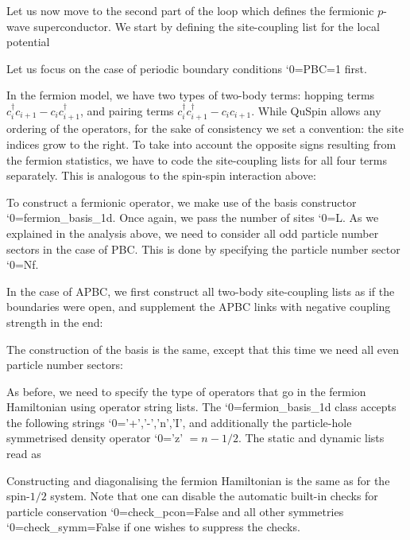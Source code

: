 \documentclass{SciPost}
\newcommand\0{\scalebox{-1}[1]{0}}
\let\svttfamily\ttfamily
\renewcommand\ttfamily{\svttfamily\catcode`0=\active }
\renewcommand\texttt{\bgroup\ttfamily\texttthelp}
\def\texttthelp#1{#1\egroup}
\newcommand{\JWcode}{example6.py}
\begin{document}
Let us now move to the second part of the loop which defines the fermionic $p$-wave superconductor. We start by defining the site-coupling list for the local potential

Let us focus on the case of periodic boundary conditions \texttt{PBC=1} first. 

In the fermion model, we have two types of two-body terms: hopping terms $c^\dagger_{i}c_{i+1} - c_{i}c^\dagger_{i+1}$, and pairing terms $c^\dagger_{i}c^\dagger_{i+1} - c_{i}c_{i+1}$. While QuSpin allows any ordering of the operators, for the sake of consistency we set a convention: the site indices grow to the right. To take into account the opposite signs resulting from the fermion statistics, we have to code the site-coupling lists for all four terms separately. This is analogous to the spin-spin interaction above:

To construct a fermionic operator, we make use of the basis constructor \texttt{fermion\_basis\_1d}. Once again, we pass the number of sites \texttt{L}. As we explained in the analysis above, we need to consider all odd particle number sectors in the case of PBC. This is done by specifying the particle number sector \texttt{Nf}. 


In the case of APBC, we first construct all two-body site-coupling lists as if the boundaries were open, and supplement the APBC links with negative coupling strength in the end:

The construction of the basis is the same, except that this time we need all even particle number sectors:


As before, we need to specify the type of operators that go in the fermion Hamiltonian using operator string lists. The \texttt{fermion\_basis\_1d} class accepts the following strings \texttt{'+','-','n','I'}, and additionally the particle-hole symmetrised density operator \texttt{'z'} $=n-1/2$. The static and dynamic lists read as

Constructing and diagonalising the fermion Hamiltonian is the same as for the spin-$1/2$ system. Note that one can disable the automatic built-in checks for particle conservation \texttt{check\_pcon=False} and all other symmetries \texttt{check\_symm=False} if one wishes to suppress the checks. 

\end{document}
